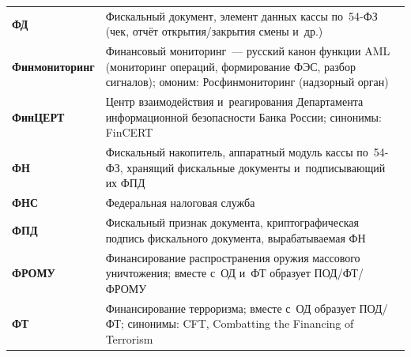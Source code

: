 \begin{longtable}{@{}p{4.5em}p{\dimexpr\linewidth-4.5em-2\tabcolsep\relax}@{}}
  \textbf{ФД}                & Фискальный документ, элемент данных кассы по~54-ФЗ (чек, отчёт открытия/закрытия смены и~др.)                                                                                                                                                                                                  \\
  \textbf{Фин\-монито\-ринг}     & Финансовый мониторинг~--- русский канон функции AML (мониторинг операций, формирование ФЭС, разбор сигналов); омоним: Росфинмониторинг (надзорный орган)                                                                                                                                         \\
  \textbf{Фин\-ЦЕРТ}           & Центр взаимодействия и~реагирования Департамента информационной безопасности Банка России; синонимы: FinCERT                                                                                                                                                                               \\
  \textbf{ФН}                & Фискальный накопитель, аппаратный модуль кассы по~54-ФЗ, хранящий фискальные документы и~подписывающий их ФПД                                                                                                                                                                                  \\
  \textbf{ФНС}               & Федеральная налоговая служба                                                                                                                                                                                                                                                                     \\
  \textbf{ФПД}               & Фискальный признак документа, криптографическая подпись фискального документа, вырабатываемая ФН                                                                                                                                                                                                \\
  \textbf{ФРОМУ}             & Финансирование распространения оружия массового уничтожения; вместе с~ОД и~ФТ образует ПОД/ФТ/ФРОМУ                                                                                                                                                                                   \\
  \textbf{ФТ}                & Финансирование терроризма; вместе с~ОД образует ПОД/ФТ; синонимы: CFT, Combatting the Financing of Terrorism                                                                                                                                                                                     \\

\end{longtable}
